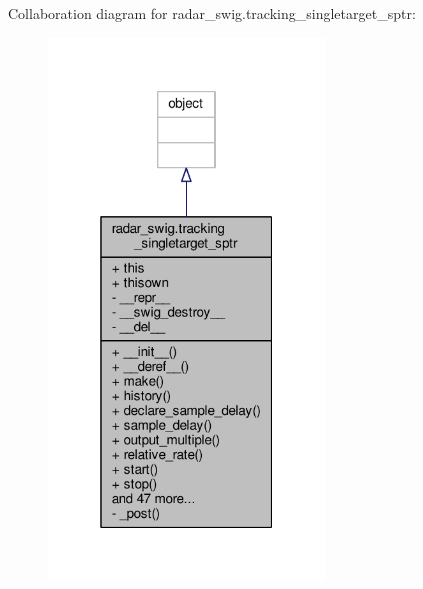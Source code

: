 Collaboration diagram for radar\+\_\+swig.\+tracking\+\_\+singletarget\+\_\+sptr\+:
\nopagebreak
\begin{figure}[H]
\begin{center}
\leavevmode
\includegraphics[width=208pt]{d8/dc3/classradar__swig_1_1tracking__singletarget__sptr__coll__graph}
\end{center}
\end{figure}

